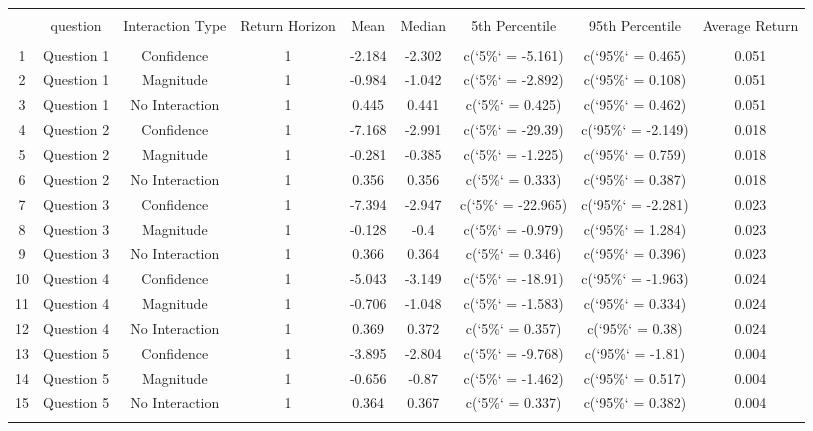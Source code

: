 
\begin{table}[!htbp] \centering 
  \caption{} 
  \label{} 
\begin{tabular}{@{\extracolsep{5pt}} ccccccccc} 
\\[-1.8ex]\hline 
\hline \\[-1.8ex] 
 & question & Interaction Type & Return Horizon & Mean & Median & 5th Percentile & 95th Percentile & Average Return \\ 
\hline \\[-1.8ex] 
1 & Question 1 & Confidence & 1 & -2.184 & -2.302 & c(`5\%` = -5.161) & c(`95\%` = 0.465) & 0.051 \\ 
2 & Question 1 & Magnitude & 1 & -0.984 & -1.042 & c(`5\%` = -2.892) & c(`95\%` = 0.108) & 0.051 \\ 
3 & Question 1 & No Interaction & 1 & 0.445 & 0.441 & c(`5\%` = 0.425) & c(`95\%` = 0.462) & 0.051 \\ 
4 & Question 2 & Confidence & 1 & -7.168 & -2.991 & c(`5\%` = -29.39) & c(`95\%` = -2.149) & 0.018 \\ 
5 & Question 2 & Magnitude & 1 & -0.281 & -0.385 & c(`5\%` = -1.225) & c(`95\%` = 0.759) & 0.018 \\ 
6 & Question 2 & No Interaction & 1 & 0.356 & 0.356 & c(`5\%` = 0.333) & c(`95\%` = 0.387) & 0.018 \\ 
7 & Question 3 & Confidence & 1 & -7.394 & -2.947 & c(`5\%` = -22.965) & c(`95\%` = -2.281) & 0.023 \\ 
8 & Question 3 & Magnitude & 1 & -0.128 & -0.4 & c(`5\%` = -0.979) & c(`95\%` = 1.284) & 0.023 \\ 
9 & Question 3 & No Interaction & 1 & 0.366 & 0.364 & c(`5\%` = 0.346) & c(`95\%` = 0.396) & 0.023 \\ 
10 & Question 4 & Confidence & 1 & -5.043 & -3.149 & c(`5\%` = -18.91) & c(`95\%` = -1.963) & 0.024 \\ 
11 & Question 4 & Magnitude & 1 & -0.706 & -1.048 & c(`5\%` = -1.583) & c(`95\%` = 0.334) & 0.024 \\ 
12 & Question 4 & No Interaction & 1 & 0.369 & 0.372 & c(`5\%` = 0.357) & c(`95\%` = 0.38) & 0.024 \\ 
13 & Question 5 & Confidence & 1 & -3.895 & -2.804 & c(`5\%` = -9.768) & c(`95\%` = -1.81) & 0.004 \\ 
14 & Question 5 & Magnitude & 1 & -0.656 & -0.87 & c(`5\%` = -1.462) & c(`95\%` = 0.517) & 0.004 \\ 
15 & Question 5 & No Interaction & 1 & 0.364 & 0.367 & c(`5\%` = 0.337) & c(`95\%` = 0.382) & 0.004 \\ 
\hline \\[-1.8ex] 
\end{tabular} 
\end{table} 
